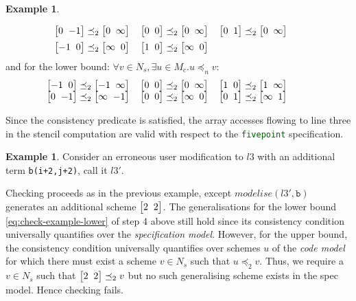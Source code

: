 \documentclass[10pt,preprint,numbers]{sigplanconf}
\newcounter{block}
\theoremstyle{definition}
\newtheorem{example}[block]{Example}
\newcommand{\vtwoh}[2]{\setlength{\arraycolsep}{0em}
\left[\begin{array}{cc}#1 \; & \; #2\end{array}\right]}
\begin{document}
\begin{example}
\begin{enumerate}
\begin{align}
\begin{array}{l}
   \hspace{-1.5em}
     \vtwoh{0}{-1} \preceq_2 \vtwoh{0}{\infty} \quad
     \vtwoh{0}{0} \preceq_2 \vtwoh{0}{\infty} \quad
     \vtwoh{0}{1} \preceq_2 \vtwoh{0}{\infty} \\[0.5em]
        \hspace{-1.5em}\vtwoh{-1}{0} \preceq_2 \vtwoh{\infty}{0} \quad
     \vtwoh{1}{0} \preceq_2 \vtwoh{\infty}{0}
     \end{array}
  \label{eq:check-example-upper}
  \end{align}
  and for the lower bound: $\forall v \in N_s, \exists u \in M_c . u
  \preceq_n v$:
  \begin{align}
    \hspace{-1em}
    \begin{array}{l}
     \hspace{-1.3em}\vtwoh{-1}{0} \preceq_2 \vtwoh{-1}{\infty} \quad
     \vtwoh{0}{0} \preceq_2 \vtwoh{0}{\infty} \quad
     \vtwoh{1}{0} \preceq_2 \vtwoh{1}{\infty}  \\
     \hspace{-1.3em}\vtwoh{0}{-1}  \preceq_2 \vtwoh{\infty}{-1} \quad
     \vtwoh{0}{0}  \preceq_2 \vtwoh{\infty}{0} \quad
     \vtwoh{0}{1}  \preceq_2 \vtwoh{\infty}{1}
     \end{array}
    \label{eq:check-example-lower}
  \end{align}
\end{enumerate}
Since the consistency predicate is satisfied, the array
  accesses flowing to line three in the stencil computation are valid
  with respect to the {\textcolor{darkgreen}{\texttt{fivepoint}}} specification.
\end{example}
\begin{example}
Consider an erroneous user modification to $l3$ with an
additional term \texttt{b(i+2,j+2)}, call it $l3'$.%
%

Checking proceeds as in the previous example, except
$\mathit{modelise}(l3',\texttt{b})$ generates an additional scheme
$\vtwoh{2}{2}$. The generalisations for
the lower bound \eqref{eq:check-example-lower}
of step 4 above still hold since its consistency condition
universally quantifies over the \emph{specification model}. However, for
the upper bound, the consistency condition universally quantifies
over schemes $u$ of the \emph{code model} for which there must exist
a scheme $v \in N_s$ such that $u \preceq_2 v$. Thus, we require a $v
\in N_s$ such that $\vtwoh{2}{2} \preceq_2 v$ but no such generalising
scheme exists in the spec model. Hence checking fails.
\end{example}
\end{document}
